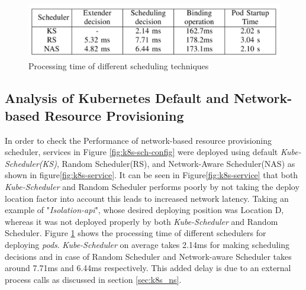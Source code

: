 \begin{figure}
  \centering
  \includegraphics[width=\linewidth]{figures/mlcn-k8s-exec-time.pdf}
  \caption{Processing time of different scheduling techniques\cite{Santos2019}}
  \label{fig:k8s-exec-t}
\end{figure}
\vspace{-0.5cm}
\subsection{Analysis of Kubernetes Default and Network-based Resource Provisioning}
\label{sec:analysis}
In order to check the Performance of network-based resource provisioning scheduler, services in Figure \ref{fig:k8s-sch-config} were deployed using default \emph{Kube-Scheduler(KS)}, Random Scheduler(RS), and Network-Aware Scheduler(NAS) as shown in figure\ref{fig:k8s-service}\cite{Santos2019}. It can be seen in Figure\ref{fig:k8s-service} that both \emph{Kube-Scheduler} and Random Scheduler performs poorly by not taking the deploy location factor into account this leads to increased network latency\cite{Santos2019}. Taking an example of "\emph{Isolation-api}", whose desired deploying position was Location D, whereas it was not deployed properly by both \emph{Kube-Scheduler} and Random Scheduler\cite{Santos2019}. Figure \ref{fig:k8s-exec-t} shows the processing time of different schedulers for deploying \emph{pods}. \emph{Kube-Scheduler} on average takes 2.14ms for making scheduling decisions and in case of Random Scheduler and Network-aware Scheduler takes around 7.71ms and 6.44ms respectively\cite{Santos2019}. This added delay is due to an external process calls as discussed in section \ref{sec:k8s_ns}.\par 
